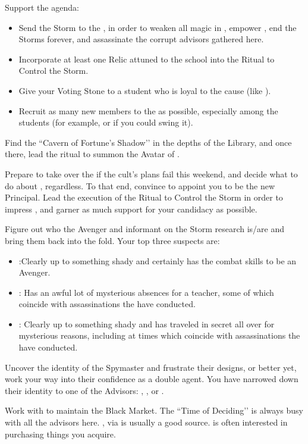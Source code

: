 \documentclass[char]{GL2020}
\begin{document}
\begin{itemz}

    \item Support the \pGoaties{} agenda:
\begin{itemize}
    \item  Send the Storm to the \pSc{}, in order to weaken all magic in \pEarth{}, empower \cGenesis{}, end the Storms forever, and assassinate the corrupt advisors gathered here.
    \item Incorporate at least one Relic attuned to the school into the Ritual to Control the Storm. 
    \item Give your Voting Stone to a student who is loyal to the cause (like \cChupStudent{}). 
    \item Recruit as many new members to the \pGoaties{} as possible, especially among the students (for example, \cPirateChild{} or \cPresident{} if you could swing it).
\end{itemize}
    \item Find the ``Cavern of Fortune’s Shadow’’ in the depths of the Library, and once there, lead the ritual to summon the Avatar of \cGenesis{}. 
    \item Prepare to take over the \pGoaties{} if the cult’s plans fail this weekend, and decide what to do about \cChupLeader{}, regardless. To that end, convince \cPrincipal{} to appoint you to be the new Principal. Lead the execution of the Ritual to Control the Storm in order to impress \cPrincipal{\them}, and garner as much support for your candidacy as possible.
    \item Figure out who the Avenger and informant on the Storm research is/are and bring them back into the fold. Your top three suspects are: 
\begin{itemize}
     \item \cInterpol{}:Clearly up to something shady and certainly has the combat skills to be an Avenger.
     \item \cChupAvenger{}: Has an awful lot of mysterious absences for a teacher, some of which coincide with assassinations the \pGoaties{} have conducted.
     \item \cWildCard{}: Clearly up to something shady and has traveled in secret all over \pEarth{} for mysterious reasons, including at times which coincide with assassinations the \pGoaties{} have conducted.
\end{itemize}
\end{itemz}

\begin{itemz}
    \item Uncover the identity of the \pShippie{} Spymaster and frustrate their designs, or better yet, work your way into their confidence as a double agent. You have narrowed down their identity to one of the \pShippie{} Advisors: \cJuniorStatesman{}, \cBunker{}, or \cEbbPriest{}.
    \item Work with \cChupInventor{} to maintain the Black Market. The ``Time of Deciding’’ is always busy with all the advisors here. \cEthics{}, via \cLibAssist{} is usually a good source. \cHedonist{} is often interested in purchasing things you acquire.
\end{itemz}
\end{document}
